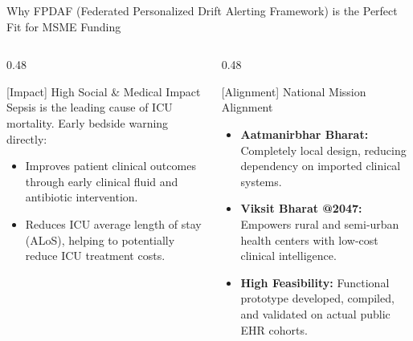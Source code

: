 \documentclass[aspectratio=169, 11pt]{beamer}
\begin{document}
\begin{frame}{Why FPDAF (Federated Personalized Drift Alerting Framework) is the Perfect Fit for MSME Funding}
    \begin{columns}[t]
        \begin{column}{0.48\textwidth}
            \begin{block}{\textcolor{neonTeal}{[Impact]} High Social \& Medical Impact}
                \scriptsize
                Sepsis is the leading cause of ICU mortality. Early bedside warning directly:
                \begin{itemize}
                    \item Improves patient clinical outcomes through early clinical fluid and antibiotic intervention.
                    \item Reduces ICU average length of stay (ALoS), helping to potentially reduce ICU treatment costs.
                \end{itemize}
            \end{block}
        \end{column}
        
        \begin{column}{0.48\textwidth}
            \begin{block}{\textcolor{neonCyan}{[Alignment]} National Mission Alignment}
                \scriptsize
                \begin{itemize}
                    \item \textbf{Aatmanirbhar Bharat:} Completely local design, reducing dependency on imported clinical systems.
                    \item \textbf{Viksit Bharat @2047:} Empowers rural and semi-urban health centers with low-cost clinical intelligence.
                    \item \textbf{High Feasibility:} Functional prototype developed, compiled, and validated on actual public EHR cohorts.
                \end{itemize}
            \end{block}
        \end{column}
    \end{columns}
\end{frame}
\end{document}
